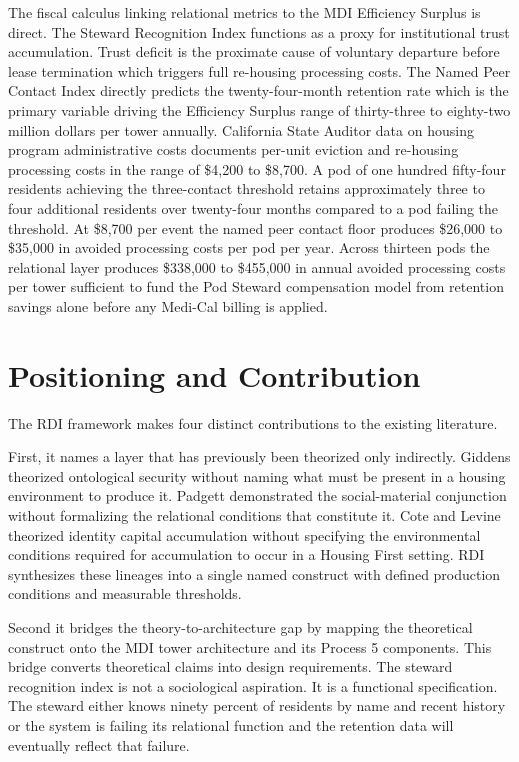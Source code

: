 \documentclass[12pt, letterpaper]{article}
\begin{document}
The fiscal calculus linking relational metrics to the MDI Efficiency Surplus is direct. The Steward Recognition Index functions as a proxy for institutional trust accumulation. Trust deficit is the proximate cause of voluntary departure before lease termination which triggers full re-housing processing costs. The Named Peer Contact Index directly predicts the twenty-four-month retention rate which is the primary variable driving the Efficiency Surplus range of thirty-three to eighty-two million dollars per tower annually. California State Auditor data \citep{ca_state_auditor_2021} on housing program administrative costs documents per-unit eviction and re-housing processing costs in the range of \$4,200 to \$8,700. A pod of one hundred fifty-four residents achieving the three-contact threshold retains approximately three to four additional residents over twenty-four months compared to a pod failing the threshold. At \$8,700 per event the named peer contact floor produces \$26,000 to \$35,000 in avoided processing costs per pod per year. Across thirteen pods the relational layer produces \$338,000 to \$455,000 in annual avoided processing costs per tower sufficient to fund the Pod Steward compensation model from retention savings alone before any Medi-Cal billing is applied.

\clearpage
\section{Positioning and Contribution}

The RDI framework makes four distinct contributions to the existing literature.

First, it names a layer that has previously been theorized only indirectly. Giddens \citep{giddens_1991} theorized ontological security without naming what must be present in a housing environment to produce it. Padgett \citep{padgett_2007} demonstrated the social-material conjunction without formalizing the relational conditions that constitute it. Cote and Levine \citep{cote_levine_2002} theorized identity capital accumulation without specifying the environmental conditions required for accumulation to occur in a Housing First setting. RDI synthesizes these lineages into a single named construct with defined production conditions and measurable thresholds.

Second it bridges the theory-to-architecture gap by mapping the theoretical construct onto the MDI tower architecture and its Process 5 components. This bridge converts theoretical claims into design requirements. The steward recognition index is not a sociological aspiration. It is a functional specification. The steward either knows ninety percent of residents by name and recent history or the system is failing its relational function and the retention data will eventually reflect that failure.
\end{document}
